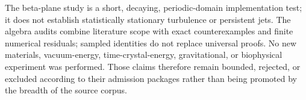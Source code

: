 The beta-plane study is a short, decaying, periodic-domain implementation test;
it does not establish statistically stationary turbulence or persistent jets.
The algebra audits combine literature scope with exact counterexamples and
finite numerical residuals; sampled identities do not replace universal proofs.
No new materials, vacuum-energy, time-crystal-energy, gravitational, or
biophysical experiment was performed. Those claims therefore remain bounded,
rejected, or excluded according to their admission packages rather than being
promoted by the breadth of the source corpus.
